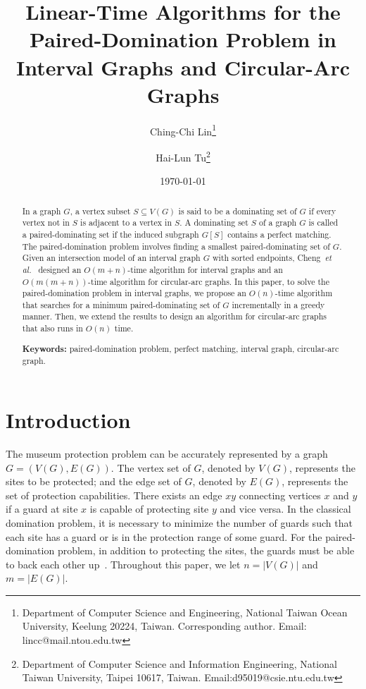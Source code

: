 \documentclass[12pt]{article}
\title{{\bf Linear-Time Algorithms for the Paired-Domination Problem in Interval Graphs and Circular-Arc Graphs}}
\author{Ching-Chi Lin\thanks{Department of Computer Science and Engineering,
                             National Taiwan Ocean University,
                             Keelung 20224, Taiwan. Corresponding author.
                             Email: lincc@mail.ntou.edu.tw}
        \and
        Hai-Lun Tu\thanks{Department of Computer Science and
                          Information Engineering,
                          National Taiwan University,
                          Taipei 10617, Taiwan.
                          Email:d95019@csie.ntu.edu.tw}
        }
\date{\today}
\begin{document}
\maketitle

\begin{abstract}
In a graph $G$, a vertex subset $S\subseteq V(G)$ is said to be a
dominating set of $G$ if every vertex not in $S$ is adjacent to a
vertex in $S$. A dominating set $S$ of a graph $G$ is called a
paired-dominating set if the induced subgraph $G[S]$ contains a
perfect matching. The paired-domination problem involves finding a
smallest paired-dominating set of $G$. Given an intersection model
of an interval graph $G$ with sorted endpoints, Cheng~{\em et
al.}~\cite{CKN07} designed an $O(m+n)$-time algorithm for interval
graphs and an $O(m(m+n))$-time algorithm for circular-arc graphs.
In this paper, to solve the paired-domination problem in interval
graphs, we propose an $O(n)$-time algorithm that searches for a
minimum paired-dominating set of $G$ incrementally in a greedy
manner. Then, we extend the results to design an algorithm for
circular-arc graphs that also runs in $O(n)$ time.

\bigskip

\noindent \textbf{Keywords:} paired-domination problem, perfect
matching, interval graph, circular-arc graph.


\end{abstract}

\newpage

\def\skippt{23pt}
\baselineskip \skippt

\section{Introduction}\label{section:intro}
The museum protection problem can be accurately represented by a
graph $G = (V(G),E(G))$. The vertex set of $G$, denoted by $V(G)$,
represents the sites to be protected; and the edge set of $G$,
denoted by $E(G)$, represents the set of protection capabilities.
There exists an edge $xy$ connecting vertices $x$ and $y$ if a
guard at site $x$ is capable of protecting site $y$ and vice
versa. In the classical domination problem, it is necessary to
minimize the number of guards such that each site has a guard or
is in the protection range of some guard. For the
paired-domination problem, in addition to protecting the sites,
the guards must be able to back each other up~\cite{HS98}.
Throughout this paper, we let $n = |V(G)|$ and $m = |E(G)|$.
\end{document}
